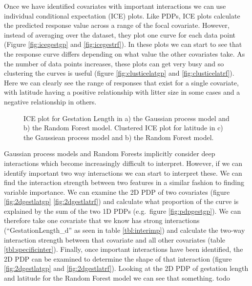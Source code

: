 \documentclass[10pt,]{article}
\begin{document}
Once we have identified covariates with important interactions we can use individual conditional expectation (ICE) plots. Like PDPs, ICE plots calculate the predicted response value across a range of the focal covariate. However, instead of averaging over the dataset, they plot one curve for each data point (Figure \ref{fig:icegestgp} and \ref{fig:icegestrf}). In these plots we can start to see that the response curve differs depending on what value the other covariates take. As the number of data points increases, these plots can get very busy and so clustering the curves is useful (figure \ref{fig:clusticelatgp} and \ref{fig:clusticelatrf}). Here we can clearly see the range of responses that exist for a single covariate, with latitude having a positive relationship with litter size in some cases and a negative relationship in others.



\begin{figure}[t!]
  \centering


  \label{fig:ice}
  \caption{
    ICE plot for Gestation Length in a) the Gaussian process model and b) the Random Forest model. 
    Clustered ICE plot for latitude in c) the Gaussiean process model and b) the Random Forest model.
  }
\end{figure}


Gaussian process models and Random Forests implicitly consider deep interactions which become increasingly difficult to interpret. However, if we can identify important two way interactions we can start to interpret these. We can find the interaction strength between two features in a similar fashion to finding variable importance. We can examine the 2D PDP of two covariates (figure \ref{fig:2dgestlatgp} \ref{fig:2dgestlatrf}) and calculate what proportion of the curve is explained by the sum of the two 1D PDPs (e.g.~figure \ref{fig:pdpgestgp}). We can therefore take one covariate that we know has strong interactions (``GestationLength\_d'' as seen in table \ref{tbl:interimp}) and calculate the two-way interaction strength between that covariate and all other covariates (table \ref{tbl:specificinter}). Finally, once important interactions have been identified, the 2D PDP can be examined to determine the shape of that interaction (figure \ref{fig:2dgestlatgp} and \ref{fig:2dgestlatrf}). Looking at the 2D PDP of gestation length and latitude for the Random Forest model we can see that something. todo
\end{document}
